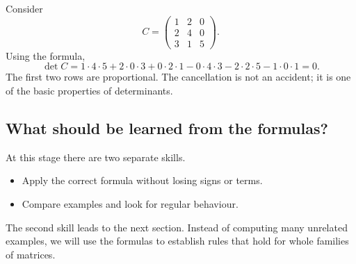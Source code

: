 \begin{examplebox}
Consider
\[
C=\begin{pmatrix}
1&2&0\\
2&4&0\\
3&1&5
\end{pmatrix}.
\]
Using the formula,
\[
\det C
=1\cdot4\cdot5+2\cdot0\cdot3+0\cdot2\cdot1
-0\cdot4\cdot3-2\cdot2\cdot5-1\cdot0\cdot1=0.
\]
The first two rows are proportional. The cancellation is not an accident; it is one of the basic properties of determinants.
\end{examplebox}

\subsection{What should be learned from the formulas?}

At this stage there are two separate skills.
\begin{itemize}
\item Apply the correct formula without losing signs or terms.
\item Compare examples and look for regular behaviour.
\end{itemize}

The second skill leads to the next section. Instead of computing many unrelated examples, we will use the formulas to establish rules that hold for whole families of matrices.
